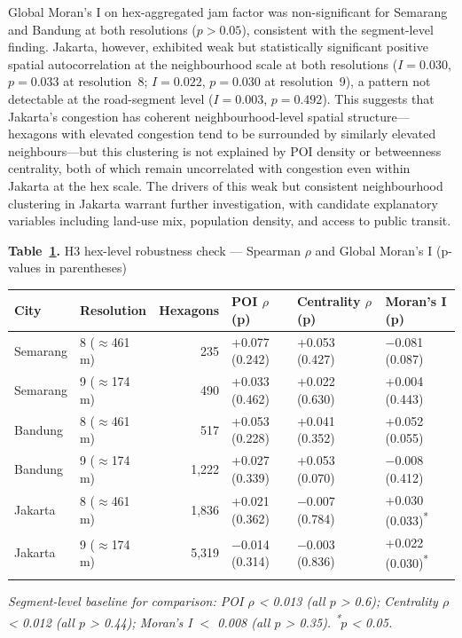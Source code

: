 \documentclass[12pt,a4paper]{article}
\begin{document}
Global Moran's I on hex-aggregated jam factor was non-significant for Semarang and Bandung at both resolutions ($p > 0.05$), consistent with the segment-level finding. Jakarta, however, exhibited weak but statistically significant positive spatial autocorrelation at the neighbourhood scale at both resolutions ($I = 0.030$, $p = 0.033$ at resolution~8; $I = 0.022$, $p = 0.030$ at resolution~9), a pattern not detectable at the road-segment level ($I = 0.003$, $p = 0.492$). This suggests that Jakarta's congestion has coherent neighbourhood-level spatial structure---hexagons with elevated congestion tend to be surrounded by similarly elevated neighbours---but this clustering is not explained by POI density or betweenness centrality, both of which remain uncorrelated with congestion even within Jakarta at the hex scale. The drivers of this weak but consistent neighbourhood clustering in Jakarta warrant further investigation, with candidate explanatory variables including land-use mix, population density, and access to public transit.

\textbf{Table~\ref{tab:h3_robustness}.} H3 hex-level robustness check --- Spearman $\rho$ and Global Moran's I (p-values in parentheses)

\begin{longtable}[]{@{}llrlll@{}}
\toprule\noalign{}
City & Resolution & Hexagons & POI $\rho$ (p) & Centrality $\rho$ (p) & Moran's I (p) \\
\midrule\noalign{}
\endhead
\bottomrule\noalign{}
\endlastfoot
Semarang & 8 ($\approx$461\,m) & 235  & +0.077 (0.242) & +0.053 (0.427) & $-$0.081 (0.087) \\
Semarang & 9 ($\approx$174\,m) & 490  & +0.033 (0.462) & +0.022 (0.630) & +0.004 (0.443) \\
Bandung  & 8 ($\approx$461\,m) & 517  & +0.053 (0.228) & +0.041 (0.352) & +0.052 (0.055) \\
Bandung  & 9 ($\approx$174\,m) & 1,222 & +0.027 (0.339) & +0.053 (0.070) & $-$0.008 (0.412) \\
Jakarta  & 8 ($\approx$461\,m) & 1,836 & +0.021 (0.362) & $-$0.007 (0.784) & +0.030 (0.033)\textsuperscript{*} \\
Jakarta  & 9 ($\approx$174\,m) & 5,319 & $-$0.014 (0.314) & $-$0.003 (0.836) & +0.022 (0.030)\textsuperscript{*} \\
\label{tab:h3_robustness}
\end{longtable}

\textit{Segment-level baseline for comparison: POI $\rho$ < 0.013 (all $p$ > 0.6); Centrality $\rho$ < 0.012 (all $p$ > 0.44); Moran's I $<$ 0.008 (all $p$ > 0.35). \textsuperscript{*}$p$ < 0.05.}
\end{document}
